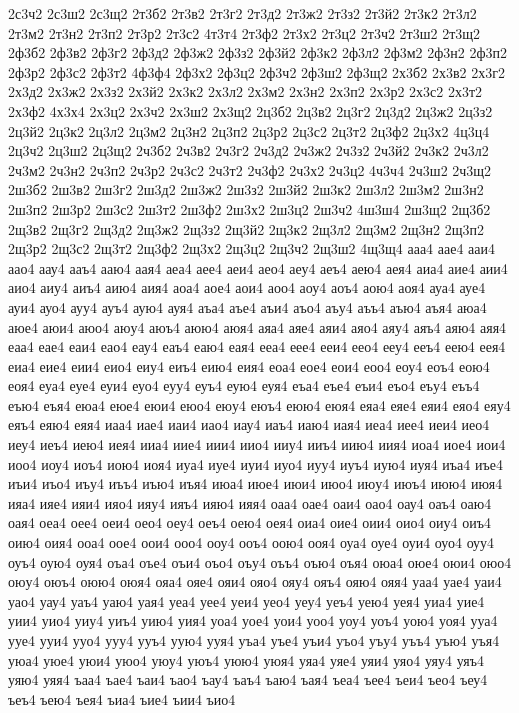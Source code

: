 {2с3ч2
2с3ш2
2с3щ2
2т3б2
2т3в2
2т3г2
2т3д2
2т3ж2
2т3з2
2т3й2
2т3к2
2т3л2
2т3м2
2т3н2
2т3п2
2т3р2
2т3с2
4т3т4
2т3ф2
2т3х2
2т3ц2
2т3ч2
2т3ш2
2т3щ2
2ф3б2
2ф3в2
2ф3г2
2ф3д2
2ф3ж2
2ф3з2
2ф3й2
2ф3к2
2ф3л2
2ф3м2
2ф3н2
2ф3п2
2ф3р2
2ф3с2
2ф3т2
4ф3ф4
2ф3х2
2ф3ц2
2ф3ч2
2ф3ш2
2ф3щ2
2х3б2
2х3в2
2х3г2
2х3д2
2х3ж2
2х3з2
2х3й2
2х3к2
2х3л2
2х3м2
2х3н2
2х3п2
2х3р2
2х3с2
2х3т2
2х3ф2
4х3х4
2х3ц2
2х3ч2
2х3ш2
2х3щ2
2ц3б2
2ц3в2
2ц3г2
2ц3д2
2ц3ж2
2ц3з2
2ц3й2
2ц3к2
2ц3л2
2ц3м2
2ц3н2
2ц3п2
2ц3р2
2ц3с2
2ц3т2
2ц3ф2
2ц3х2
4ц3ц4
2ц3ч2
2ц3ш2
2ц3щ2
2ч3б2
2ч3в2
2ч3г2
2ч3д2
2ч3ж2
2ч3з2
2ч3й2
2ч3к2
2ч3л2
2ч3м2
2ч3н2
2ч3п2
2ч3р2
2ч3с2
2ч3т2
2ч3ф2
2ч3х2
2ч3ц2
4ч3ч4
2ч3ш2
2ч3щ2
2ш3б2
2ш3в2
2ш3г2
2ш3д2
2ш3ж2
2ш3з2
2ш3й2
2ш3к2
2ш3л2
2ш3м2
2ш3н2
2ш3п2
2ш3р2
2ш3с2
2ш3т2
2ш3ф2
2ш3х2
2ш3ц2
2ш3ч2
4ш3ш4
2ш3щ2
2щ3б2
2щ3в2
2щ3г2
2щ3д2
2щ3ж2
2щ3з2
2щ3й2
2щ3к2
2щ3л2
2щ3м2
2щ3н2
2щ3п2
2щ3р2
2щ3с2
2щ3т2
2щ3ф2
2щ3х2
2щ3ц2
2щ3ч2
2щ3ш2
4щ3щ4
ааа4
аае4
ааи4
аао4
аау4
ааъ4
ааю4
аая4
аеа4
аее4
аеи4
аео4
аеу4
аеъ4
аею4
аея4
аиа4
аие4
аии4
аио4
аиу4
аиъ4
аию4
аия4
аоа4
аое4
аои4
аоо4
аоу4
аоъ4
аою4
аоя4
ауа4
ауе4
ауи4
ауо4
ауу4
ауъ4
аую4
ауя4
аъа4
аъе4
аъи4
аъо4
аъу4
аъъ4
аъю4
аъя4
аюа4
аюе4
аюи4
аюо4
аюу4
аюъ4
аюю4
аюя4
аяа4
аяе4
аяи4
аяо4
аяу4
аяъ4
аяю4
аяя4
еаа4
еае4
еаи4
еао4
еау4
еаъ4
еаю4
еая4
ееа4
еее4
ееи4
еео4
ееу4
ееъ4
еею4
еея4
еиа4
еие4
еии4
еио4
еиу4
еиъ4
еию4
еия4
еоа4
еое4
еои4
еоо4
еоу4
еоъ4
еою4
еоя4
еуа4
еуе4
еуи4
еуо4
еуу4
еуъ4
еую4
еуя4
еъа4
еъе4
еъи4
еъо4
еъу4
еъъ4
еъю4
еъя4
еюа4
еюе4
еюи4
еюо4
еюу4
еюъ4
еюю4
еюя4
еяа4
еяе4
еяи4
еяо4
еяу4
еяъ4
еяю4
еяя4
иаа4
иае4
иаи4
иао4
иау4
иаъ4
иаю4
иая4
иеа4
иее4
иеи4
иео4
иеу4
иеъ4
иею4
иея4
ииа4
иие4
иии4
иио4
ииу4
ииъ4
иию4
иия4
иоа4
иое4
иои4
иоо4
иоу4
иоъ4
иою4
иоя4
иуа4
иуе4
иуи4
иуо4
иуу4
иуъ4
иую4
иуя4
иъа4
иъе4
иъи4
иъо4
иъу4
иъъ4
иъю4
иъя4
июа4
июе4
июи4
июо4
июу4
июъ4
июю4
июя4
ияа4
ияе4
ияи4
ияо4
ияу4
ияъ4
ияю4
ияя4
оаа4
оае4
оаи4
оао4
оау4
оаъ4
оаю4
оая4
оеа4
оее4
оеи4
оео4
оеу4
оеъ4
оею4
оея4
оиа4
оие4
оии4
оио4
оиу4
оиъ4
оию4
оия4
ооа4
оое4
оои4
ооо4
ооу4
ооъ4
оою4
ооя4
оуа4
оуе4
оуи4
оуо4
оуу4
оуъ4
оую4
оуя4
оъа4
оъе4
оъи4
оъо4
оъу4
оъъ4
оъю4
оъя4
оюа4
оюе4
оюи4
оюо4
оюу4
оюъ4
оюю4
оюя4
ояа4
ояе4
ояи4
ояо4
ояу4
ояъ4
ояю4
ояя4
уаа4
уае4
уаи4
уао4
уау4
уаъ4
уаю4
уая4
уеа4
уее4
уеи4
уео4
уеу4
уеъ4
уею4
уея4
уиа4
уие4
уии4
уио4
уиу4
уиъ4
уию4
уия4
уоа4
уое4
уои4
уоо4
уоу4
уоъ4
уою4
уоя4
ууа4
ууе4
ууи4
ууо4
ууу4
ууъ4
уую4
ууя4
уъа4
уъе4
уъи4
уъо4
уъу4
уъъ4
уъю4
уъя4
уюа4
уюе4
уюи4
уюо4
уюу4
уюъ4
уюю4
уюя4
уяа4
уяе4
уяи4
уяо4
уяу4
уяъ4
уяю4
уяя4
ъаа4
ъае4
ъаи4
ъао4
ъау4
ъаъ4
ъаю4
ъая4
ъеа4
ъее4
ъеи4
ъео4
ъеу4
ъеъ4
ъею4
ъея4
ъиа4
ъие4
ъии4
ъио4
}
